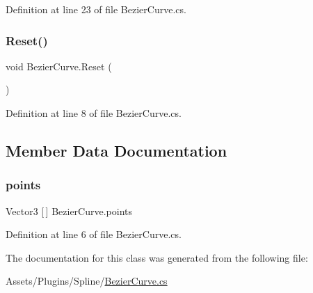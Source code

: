 Definition at line 23 of file Bezier\+Curve.\+cs.

\mbox{\label{class_bezier_curve_a75b57f3aa46a6bb6679dfa79262e29ad}} 
\subsubsection{\texorpdfstring{Reset()}{Reset()}}
{\footnotesize\ttfamily void Bezier\+Curve.\+Reset (\begin{DoxyParamCaption}{ }\end{DoxyParamCaption})}



Definition at line 8 of file Bezier\+Curve.\+cs.



\subsection{Member Data Documentation}
\mbox{\label{class_bezier_curve_a77f62121b4b7ffb30b169d91691ebcbf}} 
\subsubsection{\texorpdfstring{points}{points}}
{\footnotesize\ttfamily Vector3 \mbox{[}$\,$\mbox{]} Bezier\+Curve.\+points}



Definition at line 6 of file Bezier\+Curve.\+cs.



The documentation for this class was generated from the following file\+:\begin{DoxyCompactItemize}
\item 
Assets/\+Plugins/\+Spline/\mbox{\hyperlink{_bezier_curve_8cs}{Bezier\+Curve.\+cs}}\end{DoxyCompactItemize}
